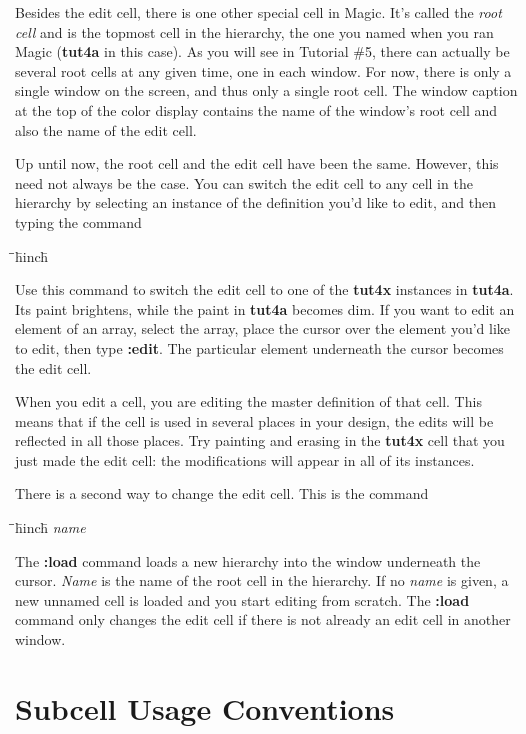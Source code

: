 \documentclass[letterpaper,twoside,12pt]{article}
\def\hinch{\hspace*{0.5in}}
\def\starti{\begin{center}\begin{tabbing}\hinch\=\hinch\=\hinch\=hinch\hinch\=\kill}
\def\endi{\end{tabbing}\end{center}}
\def\ii{\>\>\>}
\begin{document}
Besides the edit cell, there is one other special cell in Magic.
It's called the {\itshape root cell} and is the topmost cell in
the hierarchy, the one you named when you ran Magic ({\bfseries tut4a}
in this case).  As you will see in Tutorial \#5, there can
actually be several root cells at any given time, one in each window.
For now, there is only a single window on the
screen, and thus only a single root cell.  The window caption at
the top of the color display contains the name of the window's root
cell and also the name of the edit cell.

Up until now, the root cell and the edit cell have been
the same.  However, this need not always be the case.  You can
switch the edit cell to any cell in the hierarchy by selecting
an instance of the definition you'd like to edit, and then
typing the command

\starti
   \ii {\bfseries :edit}
\endi

Use this command to switch the edit cell to one of the {\bfseries tut4x}
instances in {\bfseries tut4a}.  Its paint brightens, while
the paint in {\bfseries tut4a} becomes dim.  If you want to edit
an element of an array, select the array, place the
cursor over the element you'd like to edit, then type {\bfseries :edit}.
The particular element underneath the cursor becomes the edit cell.

When you edit a cell, you are editing the master definition of that
cell.  This means that if the cell is used in several places in
your design, the edits will be reflected in all those places.
Try painting and erasing in the {\bfseries tut4x} cell that you just made
the edit cell:  the modifications will appear in all of its instances.

There is a second way to change the edit cell.  This is the command

\starti
  \ii {\bfseries :load} {\itshape name}
\endi

The {\bfseries :load} command loads a new hierarchy into the window
underneath the cursor.  {\itshape Name} is the name of the root cell in
the hierarchy.  If no {\itshape name} is given, a new unnamed cell is
loaded and you start editing from scratch.  The {\bfseries :load}
command only changes the edit cell if there is not already
an edit cell in another window.

\section{Subcell Usage Conventions}
\end{document}
